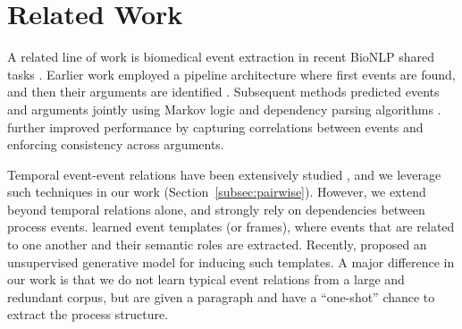 \section{Related Work}
A related line of work is biomedical event extraction in recent BioNLP shared tasks \cite{kim09,kim11}. 
Earlier work employed a pipeline architecture where first events are found, and then their arguments are identified \cite{Miwa10,Bjorne11}. Subsequent methods predicted events and arguments jointly using Markov logic \cite{Poon10} and dependency parsing algorithms \cite{Mcclosky11}.  further improved performance by capturing correlations between events and enforcing consistency across arguments.



Temporal event-event relations have been extensively studied \cite{Chambers08,Yoshikawa09,Denis11,Do12,Mcclosky12,DSouzaNg:13a}, and we leverage such techniques in our work (Section~\ref{subsec:pairwise}). However, we extend beyond temporal relations alone, and strongly rely on dependencies between process events.  learned event templates (or frames), where events that are related to one another and their semantic roles are extracted. Recently,  proposed an unsupervised generative model for inducing such templates. A major difference in our work is that we do not learn typical event relations from a large and redundant corpus, but are given a paragraph and have a ``one-shot'' chance to extract the process structure.

